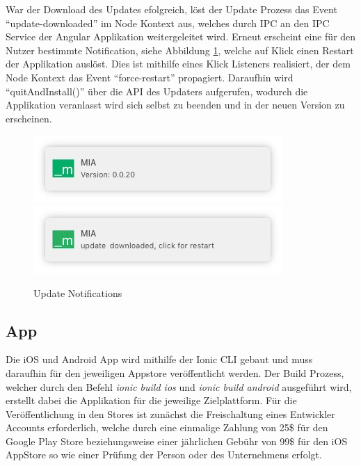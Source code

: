War der Download des Updates efolgreich, löst der Update Prozess das Event ``update-downloaded'' im Node Kontext aus,
welches durch IPC an den IPC Service der Angular Applikation weitergeleitet wird. Erneut erscheint eine für den Nutzer bestimmte Notification, siehe Abbildung \ref{kapitel4/update-push}, welche auf Klick einen Restart der Applikation auslöst.
Dies ist mithilfe eines Klick Listeners realisiert, der dem Node Kontext das Event ``force-restart'' propagiert.
Daraufhin wird ``quitAndInstall()'' über die \ac{API} des Updaters aufgerufen, wodurch die Applikation veranlasst wird sich selbst zu beenden und in der neuen Version zu erscheinen.


\begin{figure}[h]
 \centering
  \includegraphics[width=0.5\linewidth]{kapitel4/version-push.jpg}
 \includegraphics[width=0.5\linewidth]{kapitel4/update-push.jpg}
 \caption{Update Notifications}
 \label{kapitel4/update-push}
\end{figure}
\vspace{0.3cm}


\subsection{App}

Die iOS und Android App wird mithilfe der Ionic \ac{CLI} gebaut und muss daraufhin für den
jeweiligen Appstore veröffentlicht werden. Der Build Prozess,
welcher durch den Befehl \emph{ionic build ios} und \emph{ionic build android} ausgeführt wird,
erstellt dabei die Applikation für die jeweilige Zielplattform.
Für die Veröffentlichung in den Stores ist zunächst die Freischaltung eines Entwickler Accounts erforderlich,
welche durch eine einmalige Zahlung von 25\$ für den Google Play Store beziehungsweise einer jährlichen Gebühr von 99\$
für den iOS AppStore so wie einer Prüfung der Person oder des Unternehmens erfolgt.

